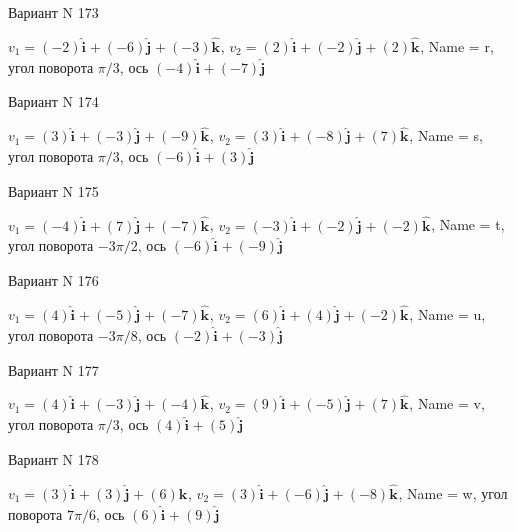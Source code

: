 \documentclass[11pt]{report}
\begin{document}
Вариант N 173

$v_1 = \left(-2\right)\mathbf{\hat{i}_{}} + \left(-6\right)\mathbf{\hat{j}_{}} + \left(-3\right)\mathbf{\hat{k}_{}}$, $v_2 = \left(2\right)\mathbf{\hat{i}_{}} + \left(-2\right)\mathbf{\hat{j}_{}} + \left(2\right)\mathbf{\hat{k}_{}}$, Name = r, угол поворота $\pi / 3$, ось $\left(-4\right)\mathbf{\hat{i}_{}} + \left(-7\right)\mathbf{\hat{j}_{}}$

Вариант N 174

$v_1 = \left(3\right)\mathbf{\hat{i}_{}} + \left(-3\right)\mathbf{\hat{j}_{}} + \left(-9\right)\mathbf{\hat{k}_{}}$, $v_2 = \left(3\right)\mathbf{\hat{i}_{}} + \left(-8\right)\mathbf{\hat{j}_{}} + \left(7\right)\mathbf{\hat{k}_{}}$, Name = s, угол поворота $\pi / 3$, ось $\left(-6\right)\mathbf{\hat{i}_{}} + \left(3\right)\mathbf{\hat{j}_{}}$

Вариант N 175

$v_1 = \left(-4\right)\mathbf{\hat{i}_{}} + \left(7\right)\mathbf{\hat{j}_{}} + \left(-7\right)\mathbf{\hat{k}_{}}$, $v_2 = \left(-3\right)\mathbf{\hat{i}_{}} + \left(-2\right)\mathbf{\hat{j}_{}} + \left(-2\right)\mathbf{\hat{k}_{}}$, Name = t, угол поворота $- 3 \pi / 2$, ось $\left(-6\right)\mathbf{\hat{i}_{}} + \left(-9\right)\mathbf{\hat{j}_{}}$

Вариант N 176

$v_1 = \left(4\right)\mathbf{\hat{i}_{}} + \left(-5\right)\mathbf{\hat{j}_{}} + \left(-7\right)\mathbf{\hat{k}_{}}$, $v_2 = \left(6\right)\mathbf{\hat{i}_{}} + \left(4\right)\mathbf{\hat{j}_{}} + \left(-2\right)\mathbf{\hat{k}_{}}$, Name = u, угол поворота $- 3 \pi / 8$, ось $\left(-2\right)\mathbf{\hat{i}_{}} + \left(-3\right)\mathbf{\hat{j}_{}}$

Вариант N 177

$v_1 = \left(4\right)\mathbf{\hat{i}_{}} + \left(-3\right)\mathbf{\hat{j}_{}} + \left(-4\right)\mathbf{\hat{k}_{}}$, $v_2 = \left(9\right)\mathbf{\hat{i}_{}} + \left(-5\right)\mathbf{\hat{j}_{}} + \left(7\right)\mathbf{\hat{k}_{}}$, Name = v, угол поворота $\pi / 3$, ось $\left(4\right)\mathbf{\hat{i}_{}} + \left(5\right)\mathbf{\hat{j}_{}}$

Вариант N 178

$v_1 = \left(3\right)\mathbf{\hat{i}_{}} + \left(3\right)\mathbf{\hat{j}_{}} + \left(6\right)\mathbf{\hat{k}_{}}$, $v_2 = \left(3\right)\mathbf{\hat{i}_{}} + \left(-6\right)\mathbf{\hat{j}_{}} + \left(-8\right)\mathbf{\hat{k}_{}}$, Name = w, угол поворота $7 \pi / 6$, ось $\left(6\right)\mathbf{\hat{i}_{}} + \left(9\right)\mathbf{\hat{j}_{}}$
\end{document}
